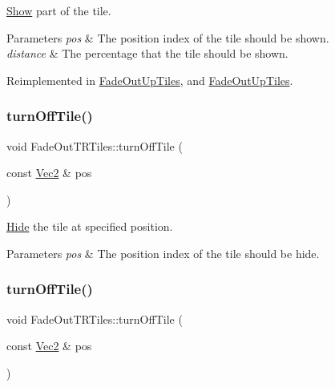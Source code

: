 \hyperlink{classShow}{Show} part of the tile. 


\begin{DoxyParams}{Parameters}
{\em pos} & The position index of the tile should be shown. \\
\hline
{\em distance} & The percentage that the tile should be shown. \\
\hline
\end{DoxyParams}


Reimplemented in \hyperlink{classFadeOutUpTiles_a00c6d04f5b87f24d43dbc6a18dc96670}{Fade\+Out\+Up\+Tiles}, and \hyperlink{classFadeOutUpTiles_a408548b6434137f3be0cb47fe43c2e2d}{Fade\+Out\+Up\+Tiles}.

\mbox{\label{classFadeOutTRTiles_a4db8d8897034bc19d449560174bd29fa}} 
\subsubsection{\texorpdfstring{turn\+Off\+Tile()}{turnOffTile()}\hspace{0.1cm}{\footnotesize\ttfamily [1/2]}}
{\footnotesize\ttfamily void Fade\+Out\+T\+R\+Tiles\+::turn\+Off\+Tile (\begin{DoxyParamCaption}\item[{const \hyperlink{classVec2}{Vec2} \&}]{pos }\end{DoxyParamCaption})}



\hyperlink{classHide}{Hide} the tile at specified position. 


\begin{DoxyParams}{Parameters}
{\em pos} & The position index of the tile should be hide. \\
\hline
\end{DoxyParams}
\mbox{\label{classFadeOutTRTiles_a4db8d8897034bc19d449560174bd29fa}} 
\subsubsection{\texorpdfstring{turn\+Off\+Tile()}{turnOffTile()}\hspace{0.1cm}{\footnotesize\ttfamily [2/2]}}
{\footnotesize\ttfamily void Fade\+Out\+T\+R\+Tiles\+::turn\+Off\+Tile (\begin{DoxyParamCaption}\item[{const \hyperlink{classVec2}{Vec2} \&}]{pos }\end{DoxyParamCaption})}



